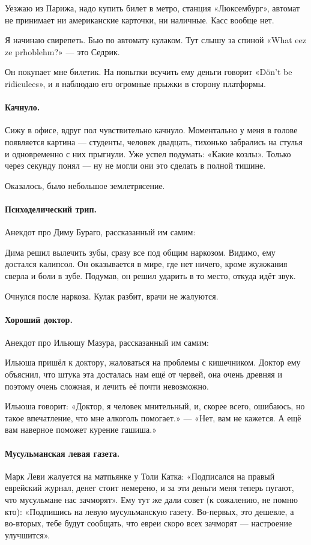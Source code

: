 \documentclass{book}
\begin{document}
Уезжаю из Парижа, надо купить билет в метро, станция «Люксембург»,
автомат не принимает ни американские карточки, ни наличные.
Касс вообще нет.

Я начинаю свирепеть.
Бью по автомату кулаком.
Тут слышу за спиной «What eez ze prhoblehm?» --- это Седрик.

Он покупает мне билетик.
На попытки всучить ему деньги говорит «D\"{o}n't be ridiculees», и я наблюдаю его огромные прыжки в сторону платформы.

\paragraph{Качнуло.}
Сижу в офисе, вдруг пол чувствительно качнуло.
Моментально у меня в голове появляется картина --- студенты, человек двадцать, тихонько забрались на стулья и одновременно с них прыгнули.
Уже успел подумать: «Какие козлы».
Только через секунду понял --- ну не могли они это сделать в полной тишине.

Оказалось, было небольшое землетрясение.

\paragraph{Психоделический трип.}
Анекдот про Диму Бураго, рассказанный им самим:

Дима решил вылечить зубы, сразу все под общим наркозом.
Видимо, ему достался калипсол.
Он оказывается в мире, где нет ничего, кроме жужжания сверла и боли в зубе.
Подумав, он решил ударить в то место, откуда идёт звук.

Очнулся после наркоза.
Кулак разбит, врачи не жалуются.

\paragraph{Хороший доктор.}
Анекдот про Ильюшу Мазура, рассказанный им самим:

Ильюша пришёл к доктору, жаловаться на проблемы с кишечником.
Доктор ему объяснил, что штука эта досталась нам ещё от червей, она очень древняя и поэтому очень сложная, и лечить её почти невозможно.

Ильюша говорит: «Доктор, я человек мнительный, и, скорее всего, ошибаюсь, но такое впечатление, что мне алкоголь помогает.» --- «Нет, вам не кажется. А ещё вам наверное поможет курение гашиша.»


\paragraph{Мусульманская левая газета.}
Марк Леви жалуется на матпьянке у Толи Катка: «Подписался на правый еврейский журнал, денег стоит немерено, и за эти деньги меня теперь пугают, что мусульмане нас зачморят».
Ему тут же дали совет (к сожалению, не помню кто):
«Подпишись на левую мусульманскую газету. 
Во-первых, это дешевле, а во-вторых, тебе будут сообщать, что евреи скоро всех зачморят --- настроение улучшится».
\end{document}
